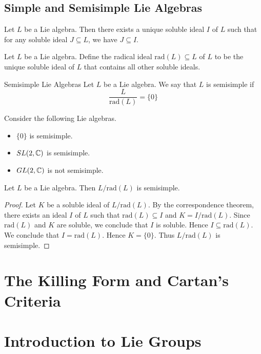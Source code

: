 \documentclass[a4paper]{article}
\begin{document}
\subsection{Simple and Semisimple Lie Algebras}
\begin{prp}{}{} Let $L$ be a Lie algebra. Then there exists a unique soluble ideal $I$ of $L$ such that for any soluble ideal $J\subseteq L$, we have $J\subseteq I$. 
\end{prp}

\begin{defn}{}{} Let $L$ be a Lie algebra. Define the radical ideal $\text{rad}(L)\subseteq L$ of $L$ to be the unique soluble ideal of $L$ that contains all other soluble ideals. 
\end{defn}

\begin{defn}{Semisimple Lie Algebras}{}{} Let $L$ be a Lie algebra. We say that $L$ is semisimple if $$\frac{L}{\text{rad}(L)}=\{0\}$$
\end{defn}

\begin{eg}{}{} Consider the following Lie algebras. 
\begin{itemize}
\item $\{0\}$ is semisimple. 
\item $SL(2,\mathbb{C})$ is semisimple. 
\item $GL(2,\mathbb{C})$ is not semisimple. 
\end{itemize}
\end{eg}

\begin{lmm}{}{} Let $L$ be a Lie algebra. Then $L/\text{rad}(L)$ is semisimple. \tcbline
\begin{proof}
Let $K$ be a soluble ideal of $L/\text{rad}(L)$. By the correspondence theorem, there exists an ideal $I$ of $L$ such that $\text{rad}(L)\subseteq I$ and $K=I/\text{rad}(L)$. Since $\text{rad}(L)$ and $K$ are soluble, we conclude that $I$ is soluble. Hence $I\subseteq\text{rad}(L)$. We conclude that $I=\text{rad}(L)$. Hence $K=\{0\}$. Thus $L/\text{rad}(L)$ is semisimple. 
\end{proof}
\end{lmm}

\pagebreak
\section{The Killing Form and Cartan's Criteria}

\pagebreak
\section{Introduction to Lie Groups}
\end{document}
